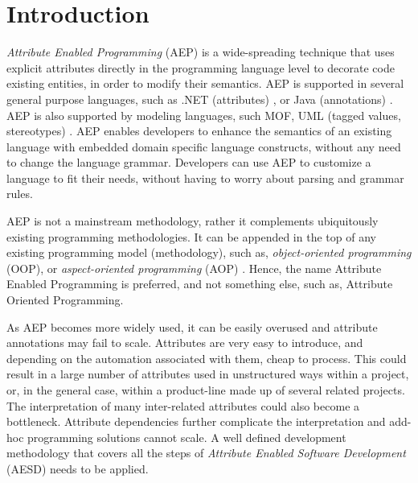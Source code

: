 \chapter{Introduction}
\label{ch01}


\noindent \textit{Attribute Enabled Programming} (AEP) is a wide-spreading technique that uses explicit attributes \cite{java.explicit.programming} directly in the programming language level to decorate code existing entities, in order to modify their semantics. AEP is supported in several general purpose languages, such as .NET (attributes) \cite{csh.attrib}, or Java (annotations) \cite{www.java.meta}. AEP is also supported by modeling languages, such MOF, UML (tagged values, stereotypes) \cite{www.mof}. AEP enables developers to enhance the semantics of an existing language with embedded domain specific language constructs, without any need to change the language grammar. Developers can use AEP to customize a language to fit their needs, without having to worry about parsing and grammar rules.

AEP is not a mainstream methodology, rather it complements ubiquitously existing programming methodologies. It can be appended in the top of any existing programming model (methodology), such as, \textit{object-oriented programming} (OOP), or \textit{aspect-oriented programming} (AOP) \cite{kiczalesetal.97}. Hence, the name Attribute Enabled Programming is preferred, and not something else, such as, Attribute Oriented Programming.

As AEP becomes more widely used, it can be easily overused and attribute annotations may fail to scale. Attributes are very easy to introduce, and depending on the automation associated with them, cheap to process. This could result in a large number of attributes used in unstructured ways within a project, or, in the general case, within a product-line made up of several related projects. The interpretation of many inter-related attributes could also become a bottleneck. Attribute dependencies further complicate the interpretation and add-hoc programming solutions cannot scale. A well defined development methodology that covers all the steps of \textit{Attribute Enabled Software Development} (AESD) needs to be applied.

